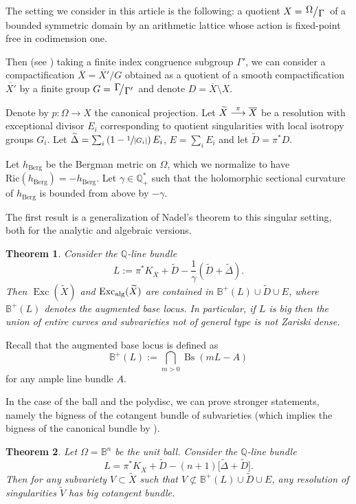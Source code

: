 \documentclass[JEP,XML,SOM,Unicode]{cedram}
\def\To#1{\mathchoice{\xrightarrow{\textstyle\kern4pt#1\kern3pt}}{\stackrel{#1}{\longrightarrow}}{}{}}
\theoremstyle{plain}
\newtheorem{thma}{Theorem}
\theoremstyle{definition}
\numberwithin{equation}{theorem}
\DeclareMathOperator{\Bs}{Bs}
\DeclareMathOperator{\Exc}{Exc}
\newcommand{\quotient}[2]{{\left.\raisebox{.2em}{$#1$}\middle/\raisebox{-.2em}{$#2$}\right.}}
\newcommand{\abs}[1]{ {\left| #1 \right| } }
\begin{document}
The setting we consider in this article is the following: a quotient $X = \quotient{\Omega}{\Gamma}$ of a bounded symmetric domain by an arithmetic lattice whose action is fixed-point free in codimension one.

Then (see \cite{mum2}) taking a finite index congruence subgroup $\Gamma'$, we can consider a compactification $\overline{X}=\overline{X'}/G$ obtained as a quotient of a smooth compactification~$\overline{X'}$ by a finite group $G = \quotient{\Gamma\!}{\Gamma'}$ and denote $D = \overline{X} \setminus X$.

Denote by $p : \Omega \to X$ the canonical projection. Let $\widetilde{X} \To{\pi} \overline{X}$ be a resolution with exceptional divisor $E_i$ corresponding to quotient singularities with local isotropy groups $G_i$. Let $\widetilde{\Delta} = \sum_i \left(1 - \sfrac{1}{\abs{G_i}} \right) E_i$, $E = \sum_i E_i$ and let $\widetilde{D} = \pi^\ast D$.

Let $h_{\mathrm{Berg}}$ be the Bergman metric on $\Omega$, which we normalize to have $\mathrm{Ric}(h_{\mathrm{Berg}}) = -h_{\mathrm{Berg}}$. Let $\gamma \in \mathbb Q_+^\ast$ such that the holomorphic sectional curvature of $h_{\mathrm{Berg}}$ is bounded from above by $- \gamma$.

The first result is a generalization of Nadel's theorem \cite{Na89} to this singular setting, both for the analytic and algebraic versions.

\begin{thma}\label{th:A} Consider the $\mathbb Q$-line bundle
$$
L := \pi^\ast K_{\overline{X}} + \widetilde{D} - \frac{1}{\gamma}( \widetilde{D} + \widetilde{\Delta}).
$$
Then $\Exc(\widetilde{X})$ and $\Exc_{\textup{alg}}(\widetilde{X})$ are contained in $\mathbb B^+(L) \cup \widetilde{D} \cup E$, where $\mathbb{B}^+(L)$ denotes the augmented base locus.
In particular, if $L$ is big then the union of entire curves and subvarieties not of general type is not Zariski dense.
\end{thma}

Recall that the augmented base locus is defined as $$\mathbb{B}^+(L):=\bigcap_{m>0} \Bs(mL-A)$$ for any ample line bundle $A$.

In the case of the ball and the polydisc, we can prove stronger statements, namely the bigness of the cotangent bundle of subvarieties (which implies the bigness of the canonical bundle by \cite{CP15}).

\begin{thma} \label{th:B} Let $\Omega = \mathbb B^n$ be the unit ball. Consider the $\mathbb Q$-line bundle
$$
L = \pi^\ast K_{\overline{X}} + \widetilde{D} - (n+1) \bigl [\widetilde{\Delta} + \widetilde{D} \bigr].
$$ Then for any subvariety $V \subset \widetilde{X}$ such that $V \not\subset \mathbb{B}^+ (L) \cup \widetilde{D} \cup E$, any resolution of singularities $\widetilde{V}$ has big cotangent bundle.
\end{thma}
\end{document}

